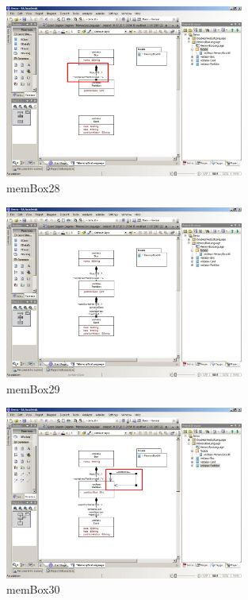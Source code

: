\begin{figure}[!h]
	\centering
  \includegraphics[width=0.7\textwidth]{pics/memBox28.png}
	\caption{memBox28}
	\label{memBox28}
\end{figure}

\begin{figure}[!h]
	\centering
  \includegraphics[width=0.7\textwidth]{pics/memBox29.png}
	\caption{memBox29}
	\label{memBox29}
\end{figure}

\begin{figure}[!h]
	\centering
  \includegraphics[width=0.7\textwidth]{pics/memBox30.png}
	\caption{memBox30}
	\label{memBox30}
\end{figure}

